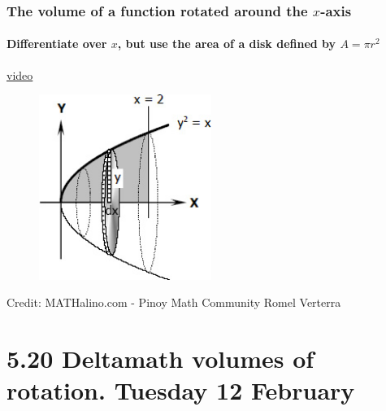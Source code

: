 \documentclass{beamer}
\begin{document}
  \frame
  {
    \frametitle{The volume of a function rotated around the $x$-axis}
    \framesubtitle{Differentiate over $x$, but use the area of a disk defined by $A=\pi r^2$}
  \href{https://www.youtube.com/watch?v=i4L5XoUBD_Q}{video}\\
  \begin{figure}[!ht]
      \centering
      \includegraphics[width=0.5\textwidth]{0413CW-paraboloid.jpg}
  \end{figure}
  \small{Credit: MATHalino.com - Pinoy Math Community Romel Verterra}
  }

\section{5.20 Deltamath volumes of rotation. Tuesday 12 February}
\end{document}
